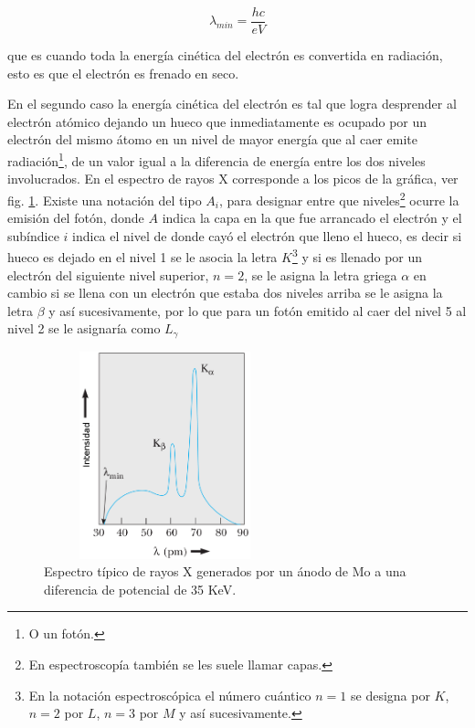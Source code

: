 \documentclass[letterpaper,10pt,twocolumn]{article}
\numberwithin{equation}{section}
\newcommand{\espaciocaps}{\setlength{\abovecaptionskip}{2pt}
  \setlength{\belowcaptionskip}{0pt}}
\begin{document}
\begin{equation}
  \label{eq:lmin}
  \lambda_{min} = \frac{hc}{eV}
\end{equation}

que es cuando toda la energía cinética del electrón es convertida en radiación, esto es que
el electrón es frenado en seco.

En el segundo caso la energía cinética del electrón es tal que logra desprender al electrón
atómico dejando un hueco que inmediatamente es ocupado por un electrón del mismo átomo en un
nivel de mayor energía que al caer emite radiación\footnote{O un fotón.}, de un valor igual a
la diferencia de energía entre los dos niveles involucrados. En el espectro de rayos X
corresponde a los picos de la gráfica, ver fig. \ref{fig:espectro}. Existe una notación del
tipo $A_{i}$, para designar entre que niveles\footnote{En espectroscopía también se les suele
  llamar capas.} ocurre la emisión del fotón, donde $A$ indica la capa en la que fue arrancado
el electrón y el subíndice $i$ indica el nivel de donde cayó el electrón que lleno el hueco,
es decir si hueco es dejado en el nivel 1 se le asocia la letra $K$\footnote{En la notación
  espectroscópica el número cuántico $n=1$ se designa por $K$, $n=2$ por $L$, $n=3$ por $M$
  y así sucesivamente.} y si es llenado por un electrón del siguiente nivel superior, $n=2$,
se le asigna la letra griega $\alpha$ en cambio si se llena con un electrón que estaba dos
niveles arriba se le asigna la letra $\beta$ y así sucesivamente, por lo que para un fotón
emitido al caer del nivel 5 al nivel 2 se le asignaría como  $L_{\gamma}$

\begin{figure}[H]
  \espaciocaps
  \centering
  \includegraphics[width=7cm,height=6cm]{espectro}
  \caption{Espectro típico de rayos X generados por un ánodo de Mo a una diferencia de
    potencial de 35 KeV.\cite{serway}}
  \label{fig:espectro}
\end{figure}
\end{document}
